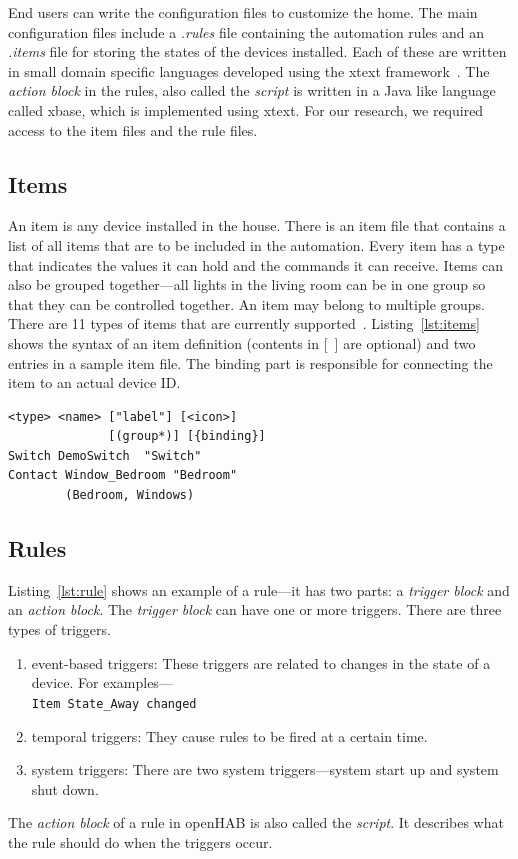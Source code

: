 \documentclass{sig-alternate-05-2015}
\begin{document}
End users can write the configuration files to customize the home. The main configuration files include a \textit{.rules} file containing the automation rules and an \textit{.items} file for storing the states of the devices installed. Each of these are written in small domain specific languages developed using the xtext framework~\cite{xtext}. The \textit{action block} in the rules, also called the \textit{script} is written in a Java like language called xbase, which is implemented using xtext. For our research, we required access to the item files and the rule files. 
\subsection{Items}
An item is any device installed in the house. There is an item file that contains a list of all items that are to be included in the automation. Every item has a type that indicates the values it can hold and the commands it can receive. Items can also be grouped together---all lights in the living room can be in one group so that they can be controlled together. An item may belong to multiple groups.
There are 11 types of items that are currently supported~\cite{openhabitem}. Listing~\ref{lst:items} shows the syntax of an item definition (contents in [~] are optional) and two entries in a sample item file. The binding part is responsible for connecting the item to an actual device ID.
\begin{lstlisting}[caption={Syntax and two examples of item definitions.},label={lst:items}]
<type> <name> ["label"] [<icon>] 
              [(group*)] [{binding}]
Switch DemoSwitch  "Switch"
Contact Window_Bedroom "Bedroom" 
        (Bedroom, Windows)
\end{lstlisting}
 
\subsection{Rules}
Listing~\ref{lst:rule} shows an example of a rule---it has two parts: a \emph{trigger block} and an \emph{action block}. The \emph{trigger block} can have one or more triggers. There are three types of triggers.
\begin{enumerate} [topsep=0pt,itemsep=-1ex]
\item event-based triggers: These triggers are related to changes in the state of a device. For examples---\\
\texttt{Item State\_Away changed}
\item temporal triggers: They cause rules to be fired at a certain time. 
\item system triggers: There are two system triggers---system start up and system shut down.
\end{enumerate}
The \emph{action block} of a rule in openHAB is also called the \emph{script}. It describes what the rule should do when the triggers occur.
\end{document}
